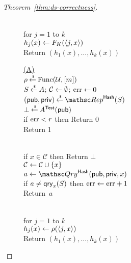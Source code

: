 \begin{proof}[Theorem~\ref{thm:ds-correctness}]
\begin{figure}[tp]
{{\medskip
{}\\
for $j = 1$ to $k$\\
\nudge $h_j(x) \gets F_K(\langle j,x \rangle) $\\
Return $\left(h_1(x),\ldots,h_k(x)\right)$
}
{
\underline{(A)}\\
$\rho {\:\stackrel{{\scriptscriptstyle \hspace{0.2em}\$}} {\leftarrow}\:} \mathrm{Func}({\cal U},[m])$\\
$S {\:\stackrel{{\scriptscriptstyle \hspace{0.2em}\$}} {\leftarrow}\:} A$; ${\cal C} \gets \emptyset$; $\mathrm{err} \gets 0$\\
$(\pubaux,\privaux) \getsr \Rep^{\HashOracle}(S)$\\
$\bot {\:\stackrel{{\scriptscriptstyle \hspace{0.2em}\$}} {\leftarrow}\:} A^{\mathsf{Test}}({\sf pub})$\\
if $\mathrm{err}  < r$ then Return 0\\
Return 1

\medskip
{}\\
if $x \in \mathcal{C}$ then Return $\bot$\\
${\cal C} \gets {\cal C} \cup \{x\}$\\
$a \gets \Qry^{\HashOracle}(\pubaux,\privaux, x)$\\
if $a \neq \mathsf{qry}_x(S)$ then $\mathrm{err} \gets \mathrm{err} + 1$\\
Return~$a$

\medskip
{}\\
for $j=1$ to $k$\\
\nudge $h_j(x) \gets \rho(\langle j,x \rangle) $\\
Return $\left(h_1(x),\ldots,h_k(x)\right)$
}
}
\end{figure}
\end{proof}
